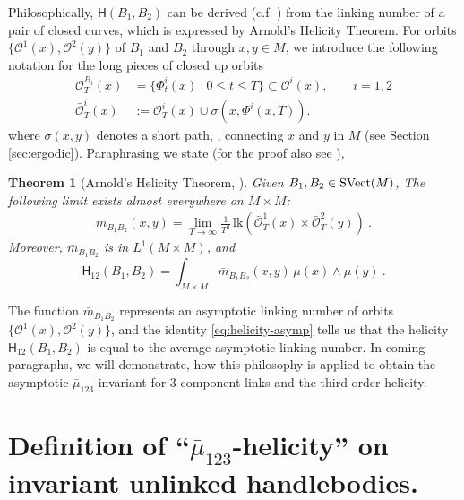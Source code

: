 \documentclass[12pt]{article}
\numberwithin{equation}{section}
\newtheorem{theorem}{Theorem}[section]
\newcommand{\no}{\noindent}
\begin{document}
 Philosophically, $\mathsf{H}(B_1,B_2)$  can be derived (c.f. \cite{Arnold86}) from the linking number of a pair of closed curves, which is expressed by Arnold's Helicity Theorem. For orbits
 $\{\mathscr{O}^1(x),\mathscr{O}^2(y)\}$  of $B_1$ and $B_2$ through $x, y\in M$, we introduce the following notation for the long pieces of closed up orbits
 \begin{equation}\label{eq:orbits}
\begin{split}
 \mathscr{O}^{B_i}_T(x) & =  \{\Phi^i_t(x)\ |\ 0\leq t\leq T\}\subset \mathscr{O}^i(x),\qquad i=1,2\\
 \bar{\mathscr{O}}^i_T(x) & :=  \mathscr{O}^i_T(x)\cup \sigma(x,\Phi^i(x,T)).
\end{split}
\end{equation}
 where $\sigma(x,y)$ denotes a short path, \cite{Vogel03}, connecting $x$ and $y$ in $M$ (see Section \ref{sec:ergodic}). Paraphrasing \cite{Arnold86} we state (for the proof also see \cite{Vogel03}),
 
\begin{theorem}[Arnold's Helicity Theorem, \cite{Arnold86}]
 Given $B_1, B_2\in\text{\rm SVect}(M)$,  The following 
 limit exists almost everywhere on $M\times M$:
 \begin{gather}\label{eq:linking-function}
  \bar{m}_{B_1 B_2}(x,y)=\lim_{T\to \infty} \frac{1}{T^2}\, \text{lk}(\bar{\mathscr{O}}^1_T(x)\times\bar{\mathscr{O}}^2_T(y))\ .
 \end{gather}
Moreover, $\bar{m}_{B_1 B_2}$ is in $L^1(M\times M)$, and 
\begin{equation}\label{eq:helicity-asymp}
 \mathsf{H}_{12}(B_1,B_2)=\int_{M\times M} \bar{m}_{B_1 B_2}(x,y)\, \mu(x)\wedge\mu(y)\ .
\end{equation}
\end{theorem}
\no The function $\bar{m}_{B_1 B_2}$ represents an asymptotic linking number of orbits $\{\mathscr{O}^1(x),\mathscr{O}^2(y)\}$, and the identity \eqref{eq:helicity-asymp} tells us that 
the helicity $\mathsf{H}_{12}(B_1,B_2)$ is equal to the average asymptotic linking number. In coming paragraphs, we will demonstrate,  how this philosophy is applied to obtain the asymptotic $\bar{\mu}_{123}$-invariant for 
3-component links and the third order helicity. 


\section{Definition of ``\texorpdfstring{$\bar{\mu}_{123}$}{mu-123}-helicity'' on invariant unlinked handlebodies.}\label{sec:handlebody}
\end{document}
